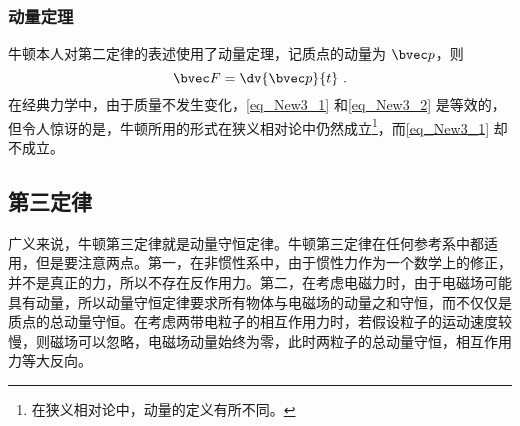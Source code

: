 \subsubsection{动量定理}
牛顿本人对第二定律的表述使用了动量定理，记质点的动量为 $\bvec p$，则
\begin{equation}\label{eq_New3_2}
\bvec F = \dv{\bvec p}{t}~.
\end{equation}
在经典力学中，由于质量不发生变化，\autoref{eq_New3_1} 和\autoref{eq_New3_2} 是等效的，但令人惊讶的是，牛顿所用的形式在狭义相对论中仍然成立\footnote{在狭义相对论中，动量的定义有所不同。}，而\autoref{eq_New3_1} 却不成立。

\subsection{第三定律}
广义来说，牛顿第三定律就是动量守恒定律。牛顿第三定律在任何参考系中都适用，但是要注意两点。第一，在非惯性系中，由于惯性力作为一个数学上的修正，并不是真正的力，所以不存在反作用力。第二，在考虑电磁力时，由于电磁场可能具有动量，所以动量守恒定律要求所有物体与电磁场的动量之和守恒，而不仅仅是质点的总动量守恒。在考虑两带电粒子的相互作用力时，若假设粒子的运动速度较慢，则磁场可以忽略，电磁场动量始终为零，此时两粒子的总动量守恒，相互作用力等大反向。
